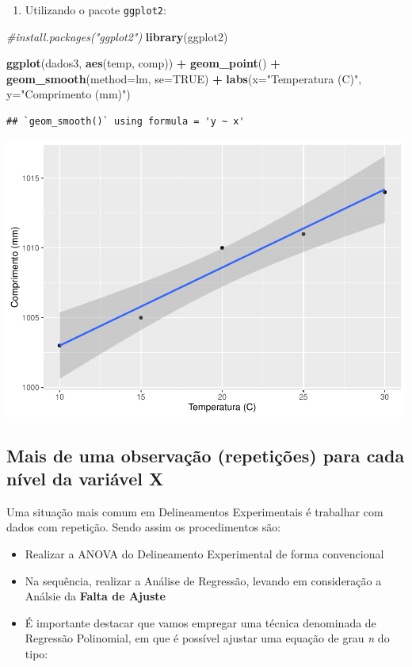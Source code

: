 \documentclass[
]{book}
\newenvironment{Shaded}{\begin{snugshade}}{\end{snugshade}}
\newcommand{\AttributeTok}[1]{\textcolor[rgb]{0.13,0.29,0.53}{#1}}
\newcommand{\CommentTok}[1]{\textcolor[rgb]{0.56,0.35,0.01}{\textit{#1}}}
\newcommand{\ConstantTok}[1]{\textcolor[rgb]{0.56,0.35,0.01}{#1}}
\newcommand{\FunctionTok}[1]{\textcolor[rgb]{0.13,0.29,0.53}{\textbf{#1}}}
\newcommand{\NormalTok}[1]{#1}
\newcommand{\SpecialCharTok}[1]{\textcolor[rgb]{0.81,0.36,0.00}{\textbf{#1}}}
\newcommand{\StringTok}[1]{\textcolor[rgb]{0.31,0.60,0.02}{#1}}
\providecommand{\tightlist}{%
  \setlength{\itemsep}{0pt}\setlength{\parskip}{0pt}}
\begin{document}
\begin{enumerate}
\def\labelenumi{\arabic{enumi}.}
\setcounter{enumi}{1}
\tightlist
\item
  Utilizando o pacote \texttt{ggplot2}:
\end{enumerate}

\begin{Shaded}
\begin{Highlighting}[]
\CommentTok{\#install.packages("ggplot2")}
\FunctionTok{library}\NormalTok{(ggplot2)}

\FunctionTok{ggplot}\NormalTok{(dados3, }\FunctionTok{aes}\NormalTok{(temp, comp)) }\SpecialCharTok{+}
  \FunctionTok{geom\_point}\NormalTok{() }\SpecialCharTok{+}
  \FunctionTok{geom\_smooth}\NormalTok{(}\AttributeTok{method=}\StringTok{\textquotesingle{}lm\textquotesingle{}}\NormalTok{, }\AttributeTok{se=}\ConstantTok{TRUE}\NormalTok{) }\SpecialCharTok{+}
  \FunctionTok{labs}\NormalTok{(}\AttributeTok{x=}\StringTok{"Temperatura (C)"}\NormalTok{, }\AttributeTok{y=}\StringTok{"Comprimento (mm)"}\NormalTok{)}
\end{Highlighting}
\end{Shaded}

\begin{verbatim}
## `geom_smooth()` using formula = 'y ~ x'
\end{verbatim}

\includegraphics[width=0.5\linewidth]{_main_files/figure-latex/graph2-1}

\subsection{Mais de uma observação (repetições) para cada nível da variável X}\label{mais-de-uma-observauxe7uxe3o-repetiuxe7uxf5es-para-cada-nuxedvel-da-variuxe1vel-x}

Uma situação mais comum em Delineamentos Experimentais é trabalhar com dados com repetição. Sendo assim os procedimentos são:

\begin{itemize}
\item
  Realizar a ANOVA do Delineamento Experimental de forma convencional
\item
  Na sequência, realizar a Análise de Regressão, levando em consideração a Análsie da \textbf{Falta de Ajuste}
\item
  É importante destacar que vamos empregar uma técnica denominada de Regressão Polinomial, em que é possível ajustar uma equação de grau \emph{n} do tipo:
\end{itemize}
\end{document}
